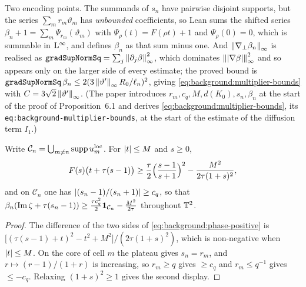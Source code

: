 Two encoding points.  The summands of $s_n$ have pairwise disjoint supports, but the series
$\sum_mr_m\vartheta_m$ has \emph{unbounded} coefficients, so Lean sums the shifted series
$\beta_n+1=\sum_m\Psi_{r_m}(\vartheta_m)$ with $\Psi_\rho(t)=F(\rho t)+1$ and
$\Psi_\rho(0)=0$, which is summable in $\mathrm{L}^\infty$, and defines $\beta_n$ as that sum minus
one.  And $\left\|\nabla_\perp\beta_n\right\|_\infty$ is realised as
$\texttt{gradSupNormSq}=\sum_j\left\|\partial_j\beta\right\|_\infty^2$, which dominates
$\left\|\left\lvert\nabla\beta\right\rvert\right\|_\infty^2$ and so appears only on the larger side of every
estimate; the proved bound is
$\texttt{gradSupNormSq}\,\beta_n\leq2(3\left\|\vartheta'\right\|_\infty R_0/\ell_n)^2$, giving
\eqref{eq:background:multiplier-bounds} with $C=3\sqrt2\left\|\vartheta'\right\|_\infty$.  (The paper
introduces $r_m,c_q,M,d(K_0),s_n,\beta_n$ at the start of the proof of Proposition~6.1 and
derives \eqref{eq:background:multiplier-bounds}, its \texttt{eq:background-multiplier-bounds},
at the start of the estimate of the diffusion term $I_1$.)

\begin{lemma}
  \label{lem:background:phase}
  \leanok
  Write $\mathcal C_n=\bigcup_{m\neq n}\operatorname{supp} u_m^{\rm loc}$.  For $\left\lvert t\right\rvert\leq M$ and
  $s\geq0$,
  \begin{equation}
    F(s)\bigl(t+\tau(s-1)\bigr)
      \geq\frac\tau2\Bigl(\frac{s-1}{s+1}\Bigr)^2-\frac{M^2}{2\tau(1+s)^2},
    \label{eq:background:phase-positive}
  \end{equation}
  and on $\mathcal C_n$ one has $\left\lvert(s_n-1)/(s_n+1)\right\rvert\geq c_q$, so that
  $\beta_n(\operatorname{Im}\zeta+\tau(s_n-1))\geq\tfrac{\tau c_q^2}2\mathbf{1}_{\mathcal C_n}-\tfrac{M^2}{2\tau}$
  throughout $\mathbb{T}^2$.
\end{lemma}

\begin{proof}
  \leanok
  The difference of the two sides of \eqref{eq:background:phase-positive} is
  $\bigl[(\tau(s-1)+t)^2-t^2+M^2\bigr]/(2\tau(1+s)^2)$, which is non-negative when
  $\left\lvert t\right\rvert\leq M$.  On the core of cell $m$ the plateau gives $s_n=r_m$, and
  $r\mapsto(r-1)/(1+r)$ is increasing, so $r_m\geq q$ gives $\geq c_q$ and
  $r_m\leq q^{-1}$ gives $\leq-c_q$.  Relaxing $(1+s)^2\geq1$ gives the second display.
\end{proof}


